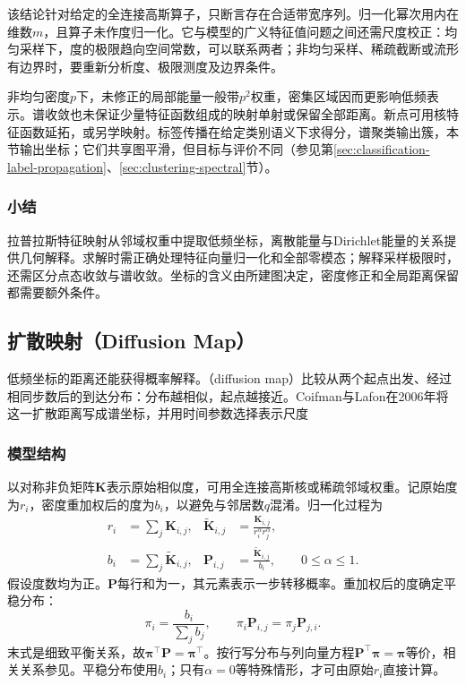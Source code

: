 该结论针对给定的全连接高斯算子，只断言存在合适带宽序列。归一化幂次用内在维数$m$，且算子未作度归一化。它与模型的广义特征值问题之间还需尺度校正：均匀采样下，度的极限趋向空间常数，可以联系两者；非均匀采样、稀疏截断或流形有边界时，要重新分析度、极限测度及边界条件。

非均匀密度$p$下，未修正的局部能量一般带$p^2$权重，密集区域因而更影响低频表示。谱收敛也未保证少量特征函数组成的映射单射或保留全部距离。新点可用核特征函数延拓，或另学映射。标签传播在给定类别语义下求得分，谱聚类输出簇，本节输出坐标；它们共享图平滑，但目标与评价不同（参见第\ref{sec:classification-label-propagation}、\ref{sec:clustering-spectral}节）。

\subsubsection{小结}

拉普拉斯特征映射从邻域权重中提取低频坐标，离散能量与Dirichlet能量的关系提供几何解释。求解时需正确处理特征向量归一化和全部零模态；解释采样极限时，还需区分点态收敛与谱收敛。坐标的含义由所建图决定，密度修正和全局距离保留都需要额外条件。

\subsection{扩散映射（Diffusion Map）}
\label{sec:dim-diffusion}

低频坐标的距离还能获得概率解释。（diffusion map）比较从两个起点出发、经过相同步数后的到达分布：分布越相似，起点越接近。Coifman与Lafon在2006年将这一扩散距离写成谱坐标，并用时间参数选择表示尺度

\subsubsection{模型结构}

以对称非负矩阵$\bm{K}$表示原始相似度，可用全连接高斯核或稀疏邻域权重。记原始度为$r_i$，密度重加权后的度为$b_i$，以避免与邻居数$q$混淆。归一化过程为
\begin{equation}
  \label{eq:dim-diffusion-normalization}
  \begin{aligned}
    r_i&=\sum_j\bm{K}_{i,j},&
    \widetilde{\bm{K}}_{i,j}
      &=\frac{\bm{K}_{i,j}}{r_i^\alpha r_j^\alpha},\\
    b_i&=\sum_j\widetilde{\bm{K}}_{i,j},&
    \bm{P}_{i,j}&=\frac{\widetilde{\bm{K}}_{i,j}}{b_i},
    \qquad 0\leq\alpha\leq1.
  \end{aligned}
\end{equation}
假设度数均为正。$\bm{P}$每行和为一，其元素表示一步转移概率。重加权后的度确定平稳分布：
\begin{equation}
  \label{eq:dim-diffusion-stationary}
  \pi_i=\frac{b_i}{\sum_j b_j},
  \qquad
  \pi_i\bm{P}_{i,j}=\pi_j\bm{P}_{j,i}.
\end{equation}
末式是细致平衡关系，故$\bm{\pi}^{\top}\bm{P}=\bm{\pi}^{\top}$。按行写分布与列向量方程$\bm P^\top\bm\pi=\bm\pi$等价，相关关系参见。平稳分布使用$b_i$；只有$\alpha=0$等特殊情形，才可由原始$r_i$直接计算。

